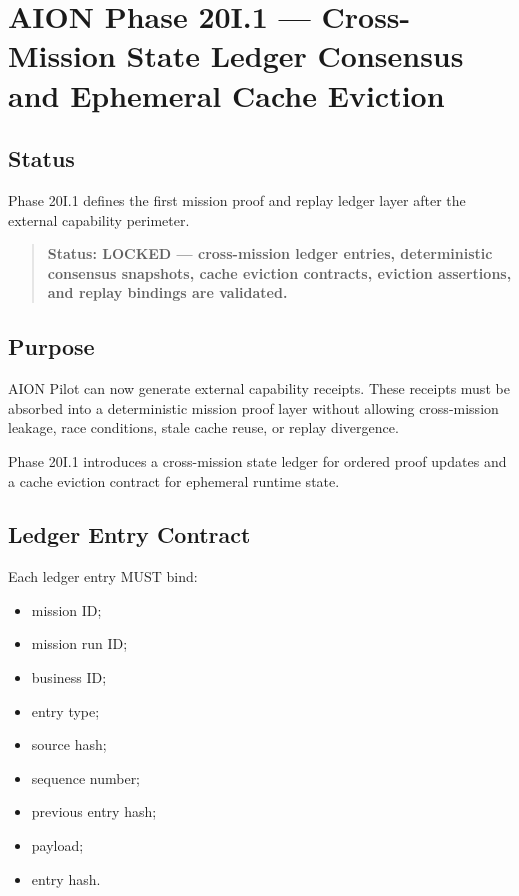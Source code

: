\section{AION Phase 20I.1 --- Cross-Mission State Ledger Consensus and Ephemeral Cache Eviction}
\label{sec:aion-phase20i1-cross-mission-state-ledger}

\subsection{Status}

Phase 20I.1 defines the first mission proof and replay ledger layer after the external capability perimeter.

\begin{quote}
\textbf{Status: LOCKED --- cross-mission ledger entries, deterministic consensus snapshots, cache eviction contracts, eviction assertions, and replay bindings are validated.}
\end{quote}

\subsection{Purpose}

AION Pilot can now generate external capability receipts. These receipts must be absorbed into a deterministic mission proof layer without allowing cross-mission leakage, race conditions, stale cache reuse, or replay divergence.

Phase 20I.1 introduces a cross-mission state ledger for ordered proof updates and a cache eviction contract for ephemeral runtime state.

\subsection{Ledger Entry Contract}

Each ledger entry MUST bind:

\begin{itemize}
  \item mission ID;
  \item mission run ID;
  \item business ID;
  \item entry type;
  \item source hash;
  \item sequence number;
  \item previous entry hash;
  \item payload;
  \item entry hash.
\end{itemize}

